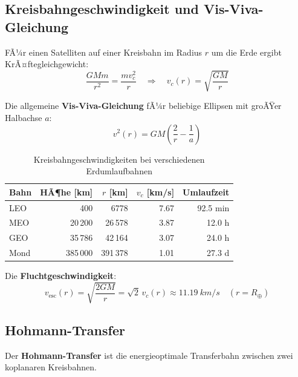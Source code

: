 ﻿\documentclass[12pt,a4paper]{article}
\begin{document}
\subsection{Kreisbahngeschwindigkeit und Vis-Viva-Gleichung}

FÃ¼r einen Satelliten auf einer Kreisbahn im Radius $r$ um die Erde ergibt
KrÃ¤ftegleichgewicht:
\[
  \frac{GMm}{r^2} = \frac{mv_c^2}{r}
  \quad\Rightarrow\quad
  v_c(r) = \sqrt{\frac{GM}{r}}
\]

Die allgemeine \textbf{Vis-Viva-Gleichung} fÃ¼r beliebige Ellipsen mit groÃŸer Halbachse $a$:
\[
  \boxed{v^2(r) = GM\left(\frac{2}{r} - \frac{1}{a}\right)}
\]

\begin{table}[H]
\centering
\caption{Kreisbahngeschwindigkeiten bei verschiedenen Erdumlaufbahnen}
\label{tab:bahnen}
\begin{tabular}{lrrrr}
\toprule
\textbf{Bahn} & \textbf{HÃ¶he [km]} & \textbf{$r$ [km]} & \textbf{$v_c$ [km/s]} & \textbf{Umlaufzeit}\\
\midrule
LEO      & 400    & 6778   & 7.67 & 92.5 min\\
MEO      & 20\,200 & 26\,578 & 3.87 & 12.0 h\\
GEO      & 35\,786 & 42\,164 & 3.07 & 24.0 h\\
Mond     & 385\,000 & 391\,378 & 1.01 & 27.3 d\\
\bottomrule
\end{tabular}
\end{table}

Die \textbf{Fluchtgeschwindigkeit}:
\[
  v_{\mathrm{esc}}(r) = \sqrt{\frac{2GM}{r}} = \sqrt{2}\,v_c(r)
  \approx \SI{11.19}{km/s} \quad (r = R_\oplus)
\]

\subsection{Hohmann-Transfer}

Der \textbf{Hohmann-Transfer} ist die energieoptimale Transferbahn zwischen zwei
koplanaren Kreisbahnen.
\end{document}
